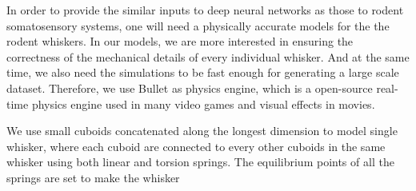 In order to provide the similar inputs to deep neural networks as those to rodent somatosensory systems, one will need a physically accurate models for the the rodent whiskers. 
In our models, we are more interested in ensuring the correctness of the mechanical details of every individual whisker. And at the same time, we also need the simulations to be fast enough for generating a large scale dataset. Therefore, we use Bullet \cite{wiki:bullet} as physics engine, which is a open-source real-time physics engine used in many video games and visual effects in movies.

We use small cuboids concatenated along the longest dimension to model single whisker, where each cuboid are connected to every other cuboids in the same whisker using both linear and torsion springs. The equilibrium points of all the springs are set to make the whisker 
